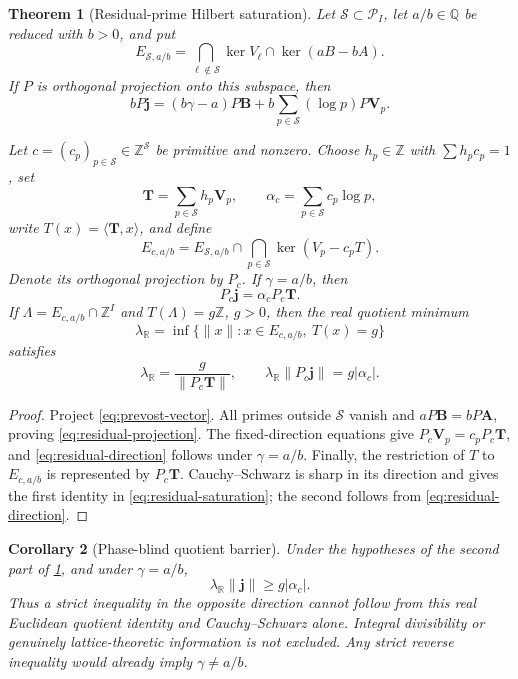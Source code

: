 \documentclass[11pt]{article}
\theoremstyle{keio}
\newtheorem{theorem}{Theorem}[section]
\newtheorem{corollary}[theorem]{Corollary}
\theoremstyle{definition}
\theoremstyle{remark}
\newcommand{\Q}{\mathbb Q}
\newcommand{\R}{\mathbb R}
\newcommand{\Z}{\mathbb Z}
\begin{document}
\begin{theorem}[Residual-prime Hilbert saturation]
\label{thm:residual-prime-saturation}
Let \(\mathcal S\subset\mathcal P_I\), let \(a/b\in\Q\) be reduced with
\(b>0\), and put
\[
 E_{\mathcal S,a/b}
 =\bigcap_{\ell\notin\mathcal S}\ker V_\ell
  \cap\ker(aB-bA).
\]
If \(P\) is orthogonal projection onto this subspace, then
\begin{equation}\label{eq:residual-projection}
 \boxed{\displaystyle
 bP\mathbf j=(b\gamma-a)P\mathbf B
 +b\sum_{p\in\mathcal S}(\log p)P\mathbf V_p.}
\end{equation}

Let \(c=(c_p)_{p\in\mathcal S}\in\Z^{\mathcal S}\) be primitive and
nonzero.  Choose \(h_p\in\Z\) with \(\sum h_pc_p=1\), set
\[
 \mathbf T=\sum_{p\in\mathcal S}h_p\mathbf V_p,
 \qquad
 \alpha_c=\sum_{p\in\mathcal S}c_p\log p,
\]
write \(T(x)=\langle\mathbf T,x\rangle\), and define
\[
 E_{c,a/b}=E_{\mathcal S,a/b}
 \cap\bigcap_{p\in\mathcal S}\ker(V_p-c_pT).
\]
Denote its orthogonal projection by \(P_c\).
If \(\gamma=a/b\), then
\begin{equation}\label{eq:residual-direction}
 \boxed{P_c\mathbf j=\alpha_cP_c\mathbf T.}
\end{equation}
If \(\Lambda=E_{c,a/b}\cap\Z^I\) and \(T(\Lambda)=g\Z\), \(g>0\), then
the real quotient minimum
\[
 \lambda_\R=\inf\{\|x\|:x\in E_{c,a/b},\ T(x)=g\}
\]
satisfies
\begin{equation}\label{eq:residual-saturation}
 \boxed{\displaystyle
 \lambda_\R=\frac g{\|P_c\mathbf T\|},
 \qquad
 \lambda_\R\|P_c\mathbf j\|=g|\alpha_c|.}
\end{equation}
\end{theorem}

\begin{proof}
Project \eqref{eq:prevost-vector}.  All primes outside \(\mathcal S\)
vanish and \(aP\mathbf B=bP\mathbf A\), proving
\eqref{eq:residual-projection}.  The fixed-direction equations give
\(P_c\mathbf V_p=c_pP_c\mathbf T\), and
\eqref{eq:residual-direction} follows under \(\gamma=a/b\).
Finally, the restriction of \(T\) to \(E_{c,a/b}\) is represented by
\(P_c\mathbf T\).  Cauchy--Schwarz is sharp in its direction and gives
the first identity in \eqref{eq:residual-saturation}; the second follows
from \eqref{eq:residual-direction}.
\end{proof}

\begin{corollary}[Phase-blind quotient barrier]
\label{cor:phase-blind-quotient}
Under the hypotheses of the second part of
\cref{thm:residual-prime-saturation}, and under \(\gamma=a/b\),
\[
 \lambda_\R\|\mathbf j\|\ge g|\alpha_c|.
\]
Thus a strict inequality in the opposite direction cannot follow from this
real Euclidean quotient identity and Cauchy--Schwarz alone.  Integral
divisibility or genuinely lattice-theoretic information is not excluded.
Any strict reverse inequality would already imply \(\gamma\ne a/b\).
\end{corollary}
\end{document}
